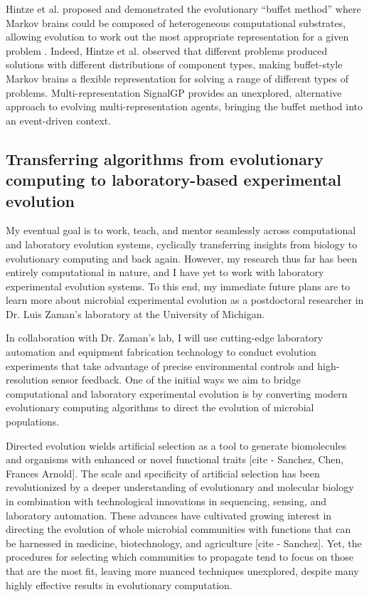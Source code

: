 Hintze et al. proposed and demonstrated the evolutionary ``buffet method'' where Markov brains could be composed of heterogeneous computational substrates, allowing evolution to work out the most appropriate representation for a given problem \citep{hintze_buffet_2019}. 
Indeed, Hintze et al. observed that different problems produced solutions with different distributions of component types, making buffet-style Markov brains a flexible representation for solving a range of different types of problems. 
Multi-representation SignalGP provides an unexplored, alternative approach to evolving multi-representation agents, bringing the buffet method into an event-driven context.

\subsection{Transferring algorithms from evolutionary computing to laboratory-based experimental evolution}


My eventual goal is to work, teach, and mentor seamlessly across computational and laboratory evolution systems, cyclically transferring insights from biology to evolutionary computing and back again.
However, my research thus far has been entirely computational in nature, and I have yet to work with laboratory experimental evolution systems.
To this end, my immediate future plans are to learn more about microbial experimental evolution as a postdoctoral researcher in Dr. Luis Zaman's laboratory at the University of Michigan.

In collaboration with Dr. Zaman's lab, I will use cutting-edge laboratory automation and equipment fabrication technology to conduct evolution experiments that take advantage of precise environmental controls and high-resolution sensor feedback.
One of the initial ways we aim to bridge computational and laboratory experimental evolution is by converting modern evolutionary computing algorithms to direct the evolution of microbial populations. 

Directed evolution wields artificial selection as a tool to generate biomolecules and organisms with enhanced or novel functional traits [cite - Sanchez, Chen, Frances Arnold]. 
The scale and specificity of artificial selection has been revolutionized by a deeper understanding of evolutionary and molecular biology in combination with technological innovations in sequencing, sensing, and laboratory automation.
These advances have cultivated growing interest in directing the evolution of whole microbial communities with functions that can be harnessed in medicine, biotechnology, and agriculture [cite - Sanchez]. 
Yet, the procedures for selecting which communities to propagate tend to focus on those that are the most fit, leaving more nuanced techniques unexplored, despite many highly effective results in evolutionary computation.

